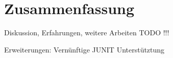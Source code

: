 \chapter{Zusammenfassung}
\label{cha:Zusammenfassung}


\todo

Diskussion, Erfahrungen, weitere Arbeiten
TODO !!!


Erweiterungen: Vernünftige JUNIT Unterstütztung